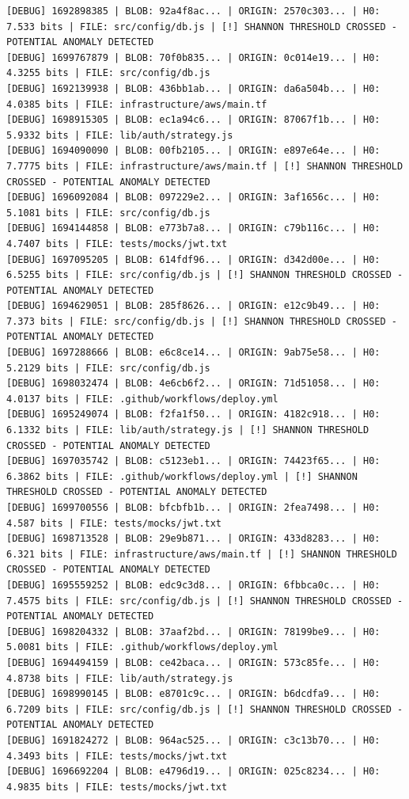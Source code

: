 \documentclass[12pt, a4paper, oneside]{report}
\begin{document}
\begin{lstlisting}[basicstyle=\tiny\ttfamily]
[DEBUG] 1692898385 | BLOB: 92a4f8ac... | ORIGIN: 2570c303... | H0: 7.533 bits | FILE: src/config/db.js | [!] SHANNON THRESHOLD CROSSED - POTENTIAL ANOMALY DETECTED
[DEBUG] 1699767879 | BLOB: 70f0b835... | ORIGIN: 0c014e19... | H0: 4.3255 bits | FILE: src/config/db.js
[DEBUG] 1692139938 | BLOB: 436bb1ab... | ORIGIN: da6a504b... | H0: 4.0385 bits | FILE: infrastructure/aws/main.tf
[DEBUG] 1698915305 | BLOB: ec1a94c6... | ORIGIN: 87067f1b... | H0: 5.9332 bits | FILE: lib/auth/strategy.js
[DEBUG] 1694090090 | BLOB: 00fb2105... | ORIGIN: e897e64e... | H0: 7.7775 bits | FILE: infrastructure/aws/main.tf | [!] SHANNON THRESHOLD CROSSED - POTENTIAL ANOMALY DETECTED
[DEBUG] 1696092084 | BLOB: 097229e2... | ORIGIN: 3af1656c... | H0: 5.1081 bits | FILE: src/config/db.js
[DEBUG] 1694144858 | BLOB: e773b7a8... | ORIGIN: c79b116c... | H0: 4.7407 bits | FILE: tests/mocks/jwt.txt
[DEBUG] 1697095205 | BLOB: 614fdf96... | ORIGIN: d342d00e... | H0: 6.5255 bits | FILE: src/config/db.js | [!] SHANNON THRESHOLD CROSSED - POTENTIAL ANOMALY DETECTED
[DEBUG] 1694629051 | BLOB: 285f8626... | ORIGIN: e12c9b49... | H0: 7.373 bits | FILE: src/config/db.js | [!] SHANNON THRESHOLD CROSSED - POTENTIAL ANOMALY DETECTED
[DEBUG] 1697288666 | BLOB: e6c8ce14... | ORIGIN: 9ab75e58... | H0: 5.2129 bits | FILE: src/config/db.js
[DEBUG] 1698032474 | BLOB: 4e6cb6f2... | ORIGIN: 71d51058... | H0: 4.0137 bits | FILE: .github/workflows/deploy.yml
[DEBUG] 1695249074 | BLOB: f2fa1f50... | ORIGIN: 4182c918... | H0: 6.1332 bits | FILE: lib/auth/strategy.js | [!] SHANNON THRESHOLD CROSSED - POTENTIAL ANOMALY DETECTED
[DEBUG] 1697035742 | BLOB: c5123eb1... | ORIGIN: 74423f65... | H0: 6.3862 bits | FILE: .github/workflows/deploy.yml | [!] SHANNON THRESHOLD CROSSED - POTENTIAL ANOMALY DETECTED
[DEBUG] 1699700556 | BLOB: bfcbfb1b... | ORIGIN: 2fea7498... | H0: 4.587 bits | FILE: tests/mocks/jwt.txt
[DEBUG] 1698713528 | BLOB: 29e9b871... | ORIGIN: 433d8283... | H0: 6.321 bits | FILE: infrastructure/aws/main.tf | [!] SHANNON THRESHOLD CROSSED - POTENTIAL ANOMALY DETECTED
[DEBUG] 1695559252 | BLOB: edc9c3d8... | ORIGIN: 6fbbca0c... | H0: 7.4575 bits | FILE: src/config/db.js | [!] SHANNON THRESHOLD CROSSED - POTENTIAL ANOMALY DETECTED
[DEBUG] 1698204332 | BLOB: 37aaf2bd... | ORIGIN: 78199be9... | H0: 5.0081 bits | FILE: .github/workflows/deploy.yml
[DEBUG] 1694494159 | BLOB: ce42baca... | ORIGIN: 573c85fe... | H0: 4.8738 bits | FILE: lib/auth/strategy.js
[DEBUG] 1698990145 | BLOB: e8701c9c... | ORIGIN: b6dcdfa9... | H0: 6.7209 bits | FILE: src/config/db.js | [!] SHANNON THRESHOLD CROSSED - POTENTIAL ANOMALY DETECTED
[DEBUG] 1691824272 | BLOB: 964ac525... | ORIGIN: c3c13b70... | H0: 4.3493 bits | FILE: tests/mocks/jwt.txt
[DEBUG] 1696692204 | BLOB: e4796d19... | ORIGIN: 025c8234... | H0: 4.9835 bits | FILE: tests/mocks/jwt.txt
\end{lstlisting}
\end{document}
